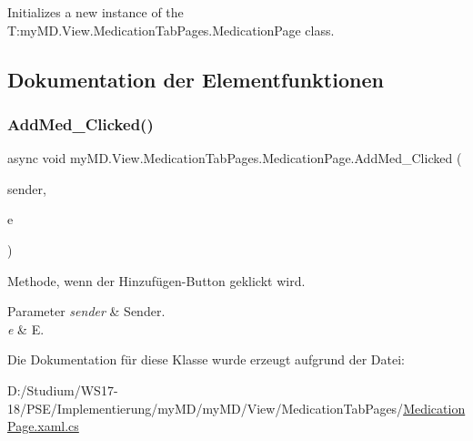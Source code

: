 Initializes a new instance of the T\+:my\+M\+D.\+View.\+Medication\+Tab\+Pages.\+Medication\+Page class. 



\subsection{Dokumentation der Elementfunktionen}
\mbox{\label{classmy_m_d_1_1_view_1_1_medication_tab_pages_1_1_medication_page_a8f462e0f3c47fc90db5745284f1186e8}} 
\subsubsection{\texorpdfstring{Add\+Med\+\_\+\+Clicked()}{AddMed\_Clicked()}}
{\footnotesize\ttfamily async void my\+M\+D.\+View.\+Medication\+Tab\+Pages.\+Medication\+Page.\+Add\+Med\+\_\+\+Clicked (\begin{DoxyParamCaption}\item[{object}]{sender,  }\item[{Event\+Args}]{e }\end{DoxyParamCaption})}



Methode, wenn der Hinzufügen-\/\+Button geklickt wird. 


\begin{DoxyParams}{Parameter}
{\em sender} & Sender.\\
\hline
{\em e} & E.\\
\hline
\end{DoxyParams}


Die Dokumentation für diese Klasse wurde erzeugt aufgrund der Datei\+:\begin{DoxyCompactItemize}
\item 
D\+:/\+Studium/\+W\+S17-\/18/\+P\+S\+E/\+Implementierung/my\+M\+D/my\+M\+D/\+View/\+Medication\+Tab\+Pages/\mbox{\hyperlink{_medication_page_8xaml_8cs}{Medication\+Page.\+xaml.\+cs}}\end{DoxyCompactItemize}
